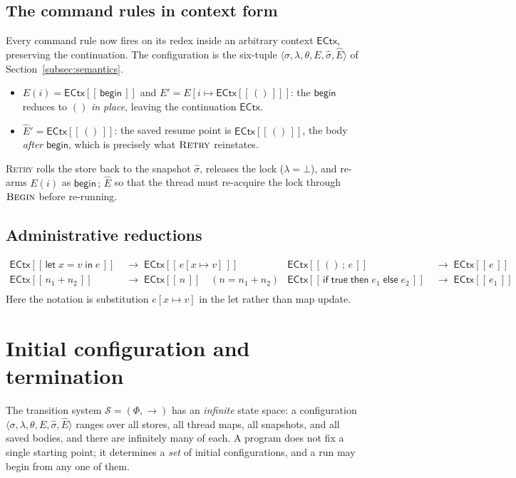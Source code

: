 \documentclass[manuscript,nonacm]{acmart}
\theoremstyle{acmdefinition}
\newcommand{\reduces}{\longrightarrow}
\newcommand{\unit}{()}
\newcommand{\bbegin}{\textsf{begin}}
\newcommand{\subst}[3]{#1[#2\mapsto #3]}
\newcommand{\ectx}{\mathsf{ECtx}}
\newcommand{\ehole}[1]{\ectx[[\, #1 \,]]}
\begin{document}
\subsection{The command rules in context form}

Every command rule now fires on its redex inside an arbitrary context $\ectx$,
preserving the continuation. The configuration is the six-tuple
$\langle\sigma,\lambda,\theta,E,\hat{\sigma},\hat{E}\rangle$ of
Section~\ref{subsec:semantics}.

\begin{itemize}
\item $E(i)=\ehole{\bbegin}$ and $E'=E[i\mapsto \ehole{\unit}]$: the $\bbegin$ reduces to
$\unit$ \emph{in place}, leaving the continuation $\ectx$.
\item $\hat{E}'=\ehole{\unit}$: the saved resume point is $\ehole{\unit}$,
the body \emph{after} $\bbegin$, which is precisely what $\textsc{Retry}$
reinstates.
\end{itemize}
\textsc{Retry} rolls the store back to
the snapshot $\hat{\sigma}$, releases the lock ($\lambda = \bot$), and
re-arms $E(i)$ as $\bbegin\,;\,\hat{E}$ so that the thread must re-acquire the
lock through $\textsc{Begin}$ before re-running.

\subsection{Administrative reductions}


\[
\begin{aligned}
\ehole{\textsf{let}\;x = v\;\textsf{in}\;e} &\;\reduces\; \ehole{\subst{e}{x}{v}} &
\ehole{\unit \,;\, e} &\;\reduces\; \ehole{e} \\
\ehole{n_1 + n_2} &\;\reduces\; \ehole{n} \quad (n = n_1 + n_2) &
\ehole{\textsf{if}\;\textsf{true}\;\textsf{then}\;e_1\;\textsf{else}\;e_2}
   &\;\reduces\; \ehole{e_1} \\
\end{aligned}
\]
Here the notation is substitution $\subst{e}{x}{v}$ in the \textsf{let}
rather than map update.




\section{Initial configuration and termination}
\label{sec:init-final}

The transition system $\mathcal{S}=(\Phi,\rightarrow)$ has an \emph{infinite}
state space: a configuration $\langle\sigma,\lambda,\theta,E,\hat{\sigma},\hat{E}\rangle$
ranges over all stores, all thread maps, all snapshots, and all saved bodies, and
there are infinitely many of each. A program does not fix a single starting point;
it determines a \emph{set} of initial configurations, and a run may begin from any
one of them.
\end{document}
